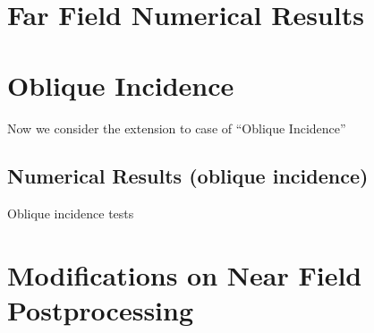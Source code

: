 \documentclass[smaller,xcolor=table,dvipsnames]{beamer}
\newcommand{\dirinputtex}{./inputtex}
\begin{document}
  
  
\section{Far Field Numerical Results}
  

  
  


  \section{Oblique Incidence}

  \begin{frame}[plain]

    {Now we consider the extension to case of ``Oblique
      Incidence''}
    
  \end{frame}

  



  \subsection{Numerical Results (oblique incidence)}
  
  \begin{frame}[plain,label=TestOblicuo]
    \centering    \Large{Oblique incidence tests}
  \end{frame}






\section{Modifications on Near Field Postprocessing}
\end{document}
